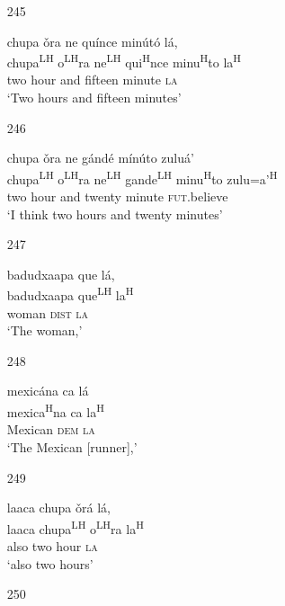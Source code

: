 \begin{itemize}
\item[245]
 
\glll   chupa \v{o}ra ne qu\'{i}nce min\'{u}t\'{o} l\'{a},\\
 chupa\textsuperscript{LH} o\textsuperscript{LH}ra ne\textsuperscript{LH} qui\textsuperscript{H}nce minu\textsuperscript{H}to la\textsuperscript{H}\\
 two hour and fifteen minute \textsc{la}\\
\glt `Two hours and fifteen minutes'
 


\item[246]
 
\glll   chupa \v{o}ra ne g\'{a}nd\'{e} m\'{i}n\'{u}to zulu\'{a}'\\
chupa\textsuperscript{LH} o\textsuperscript{LH}ra ne\textsuperscript{LH} gande\textsuperscript{LH} minu\textsuperscript{H}to zulu=a'\textsuperscript{H}\\
 two hour and twenty minute \textsc{fut}.believe\\
\glt `I think two hours and twenty minutes'
 


\item[247]
 
\glll   badudxaapa que l\'{a},\\
badudxaapa que\textsuperscript{LH} la\textsuperscript{H}\\
woman \textsc{dist} \textsc{la}\\
\glt `The woman,'
 


\item[248]
 
\glll   mexic\'{a}na ca l\'{a}\\
mexica\textsuperscript{H}na ca la\textsuperscript{H} \\
Mexican \textsc{dem} \textsc{la}\\
\glt `The Mexican [runner],' 
 


\item[249]
 
\glll   laaca chupa \v{o}r\'{a} l\'{a},\\
 laaca chupa\textsuperscript{LH} o\textsuperscript{LH}ra la\textsuperscript{H}\\
 also two hour \textsc{la}\\
\glt `also two hours'
 


\item[250]
 

\end{itemize}

